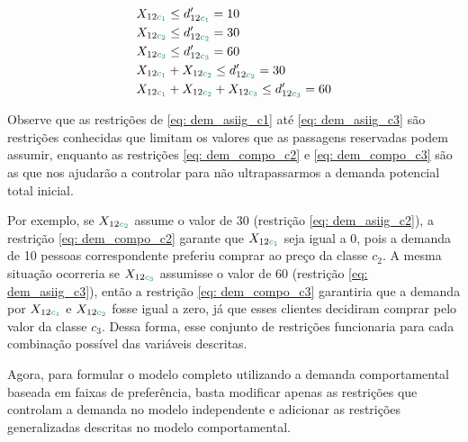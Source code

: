 \begin{align}
    & X_{12\textcolor[rgb]{0.0588, 0.5412, 0.4275}{c_1}} \leq d'_{12\textcolor[rgb]{0.0588, 0.5412, 0.4275}{c_1}} = 10                        \label{eq: dem_asiig_c1} \\
    & X_{12\textcolor[rgb]{0.0588, 0.5412, 0.4275}{c_2}} \leq d'_{12\textcolor[rgb]{0.0588, 0.5412, 0.4275}{c_2}} = 30                        \label{eq: dem_asiig_c2} \\
    & X_{12\textcolor[rgb]{0.0588, 0.5412, 0.4275}{c_3}} \leq d'_{12\textcolor[rgb]{0.0588, 0.5412, 0.4275}{c_3}} = 60                      \label{eq: dem_asiig_c3} \\
    & X_{12\textcolor[rgb]{0.0588, 0.5412, 0.4275}{c_1}} + X_{12\textcolor[rgb]{0.0588, 0.5412, 0.4275}{c_2}} \leq d'_{12\textcolor[rgb]{0.0588, 0.5412, 0.4275}{c_2}}  = 30           \label{eq: dem_compo_c2} \\
    & X_{12\textcolor[rgb]{0.0588, 0.5412, 0.4275}{c_1}} + X_{12\textcolor[rgb]{0.0588, 0.5412, 0.4275}{c_2}} + X_{12\textcolor[rgb]{0.0588, 0.5412, 0.4275}{c_3}} \leq d'_{12\textcolor[rgb]{0.0588, 0.5412, 0.4275}{c_3}} = 60 \label{eq: dem_compo_c3}                    
\end{align}

Observe que as restrições de \ref{eq: dem_asiig_c1} até \ref{eq: dem_asiig_c3} são restrições conhecidas que limitam os valores que as passagens reservadas podem assumir, enquanto as restrições \ref{eq: dem_compo_c2} e \ref{eq: dem_compo_c3} são as que nos ajudarão a controlar para não ultrapassarmos a demanda potencial total inicial. 

Por exemplo, se $X_{12\textcolor[rgb]{0.0588, 0.5412, 0.4275}{c_2}}$ assume o valor de 30 (restrição \ref{eq: dem_asiig_c2}), a restrição \ref{eq: dem_compo_c2} garante que $X_{12\textcolor[rgb]{0.0588, 0.5412, 0.4275}{c_1}}$ seja igual a 0, pois a demanda de 10 pessoas correspondente preferiu comprar ao preço da classe $c_2$. A mesma situação ocorreria se $X_{12\textcolor[rgb]{0.0588, 0.5412, 0.4275}{c_3}}$ assumisse o valor de 60 (restrição \ref{eq: dem_asiig_c3}), então a restrição \ref{eq: dem_compo_c3} garantiria que a demanda por $X_{12\textcolor[rgb]{0.0588, 0.5412, 0.4275}{c_1}}$ e $X_{12\textcolor[rgb]{0.0588, 0.5412, 0.4275}{c_2}}$ fosse igual a zero, já que esses clientes decidiram comprar pelo valor da classe $c_3$. Dessa forma, esse conjunto de restrições funcionaria para cada combinação possível das variáveis descritas.

Agora, para formular o modelo completo utilizando a demanda comportamental baseada em faixas de preferência, basta modificar apenas as restrições que controlam a demanda no modelo independente e adicionar as restrições generalizadas descritas no modelo comportamental.


